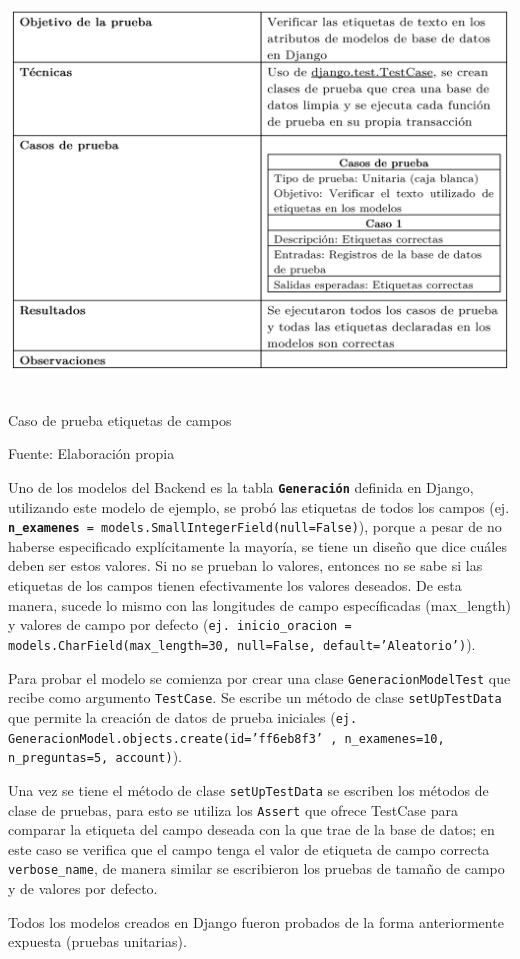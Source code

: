 \documentclass[../Main.tex]{subfiles}
\begin{document}
    \begin{table}[H]
	\begin{Center}
		\includegraphics[width=5.8in,height=4.2in]{Chapters/06ChapterPruebas/images/caso_prueba_django.png}
	    \caption{Caso de prueba etiquetas de campos}
	    Fuente: Elaboración propia
        \label{tab:table1}
	\end{Center}
    \end{table}

    Uno de los modelos del Backend es la tabla \textbf{\texttt{Generación}} definida en Django, utilizando este modelo de ejemplo, se probó las etiquetas de todos los campos (ej. \texttt{\textbf{n\_examenes} = models.SmallIntegerField(null=False)}), porque a pesar de no haberse especificado explícitamente la mayoría, se tiene un diseño que dice cuáles deben ser estos valores. Si no se prueban lo valores, entonces no se sabe si las etiquetas de los campos tienen efectivamente los valores deseados. De esta manera, sucede lo mismo con las longitudes de campo específicadas (max\_length) y valores de campo por defecto (\texttt{ej. inicio\_oracion = models.CharField(max\_length=30, null=False, default='Aleatorio')}).
    
    Para probar el modelo se comienza por crear una clase \texttt{GeneracionModelTest} que recibe como argumento \texttt{TestCase}. Se escribe un método de clase \texttt{setUpTestData} que permite la creación de datos de prueba iniciales 
    (\texttt{ej. GeneracionModel.objects.create(id='ff6eb8f3' , n\_examenes=10,  n\_preguntas=5, account)}).
    
    Una vez se tiene el método de clase \texttt{setUpTestData} se escriben los métodos de clase de pruebas, para esto se utiliza los \texttt{Assert} que ofrece TestCase para comparar la etiqueta del campo deseada con la que trae de la base de datos; en este caso se verifica que el campo tenga el valor de etiqueta de campo correcta \texttt{verbose\_name}, de manera similar se escribieron los pruebas de tamaño de campo y de valores por defecto.
    
    Todos los modelos creados en Django fueron probados de la forma anteriormente expuesta (pruebas unitarias).
\end{document}
